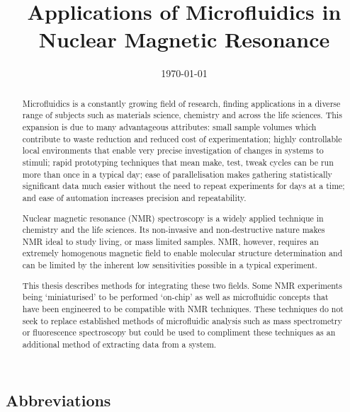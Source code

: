\documentclass[oneside]{ecsthesis}      %
\begin{document}
\frontmatter
\title      {\LARGE{Applications of Microfluidics in Nuclear Magnetic Resonance}}
\date       {\today}
\subject    {}
\keywords   {}
\maketitle
\begin{abstract}
  Microfluidics is a constantly growing field of research, finding applications in a diverse range of subjects
  such as materials science, chemistry and across the life sciences. This expansion is due to many advantageous attributes:
  small sample volumes which contribute to waste reduction and reduced cost of
  experimentation; highly controllable local environments that enable very precise investigation of changes in
  systems to stimuli; rapid prototyping techniques that mean make, test, tweak cycles can be run more than once
  in a typical day; ease of parallelisation makes gathering statistically significant data much easier without
  the need to repeat experiments for days at a time; and ease of automation increases precision and repeatability.

  Nuclear magnetic resonance (NMR) spectroscopy is a widely applied technique in chemistry and the life sciences.
  Its non-invasive and non-destructive nature makes NMR ideal to study living, or mass limited samples. NMR, however,
  requires an extremely homogenous magnetic field to enable molecular structure determination and can be limited
  by the inherent low sensitivities possible in a typical experiment.

  This thesis describes methods for integrating these two fields. Some NMR experiments being ‘miniaturised’ to
  be performed ‘on-chip’ as well as microfluidic concepts that have been engineered to be compatible with NMR
  techniques. These techniques do not seek to replace established methods of microfluidic analysis such as mass
  spectrometry or fluorescence spectroscopy but could be used to compliment these techniques as an additional
  method of extracting data from a system.

\end{abstract}
\tableofcontents
\newpage
\begin{center}
\section*{Abbreviations}
\end{center}
\end{document}
